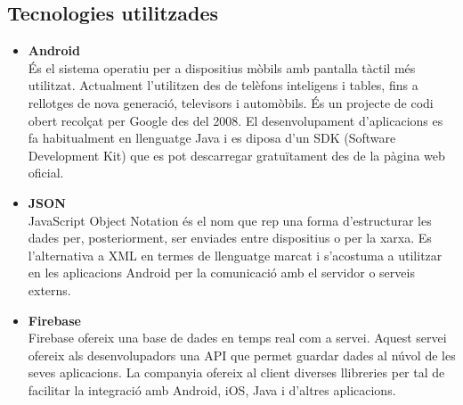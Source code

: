 \subsection{Tecnologies utilitzades}
\begin{itemize}
\item[]{\textbf{Android}}\\
És el sistema operatiu per a dispositius mòbils amb pantalla tàctil més utilitzat. Actualment l'utilitzen des de telèfons inteligens i tables, fins a rellotges de nova generació, televisors i automòbils. És un projecte de codi obert recolçat per Google des del 2008. El desenvolupament d'aplicacions es fa habitualment en llenguatge Java i es diposa d'un SDK (Software Development Kit) que es pot descarregar gratuïtament des de la pàgina web oficial.\\

\item[]{\textbf{JSON}}\\
JavaScript Object Notation és el nom que rep una forma d'estructurar les dades per, posteriorment, ser enviades entre dispositius o per la xarxa. Es l'alternativa a XML en termes de llenguatge marcat i s'acostuma a utilitzar en les aplicacions Android per la comunicació amb el servidor o serveis externs.\\

\item[]{\textbf{Firebase}}\\
Firebase ofereix una base de dades en temps real com a servei. Aquest servei ofereix als desenvolupadors una API que permet guardar dades al núvol de les seves aplicacions. La companyia ofereix al client diverses llibreries per tal de facilitar la integració amb Android, iOS, Java i d'altres aplicacions.

\end{itemize}




